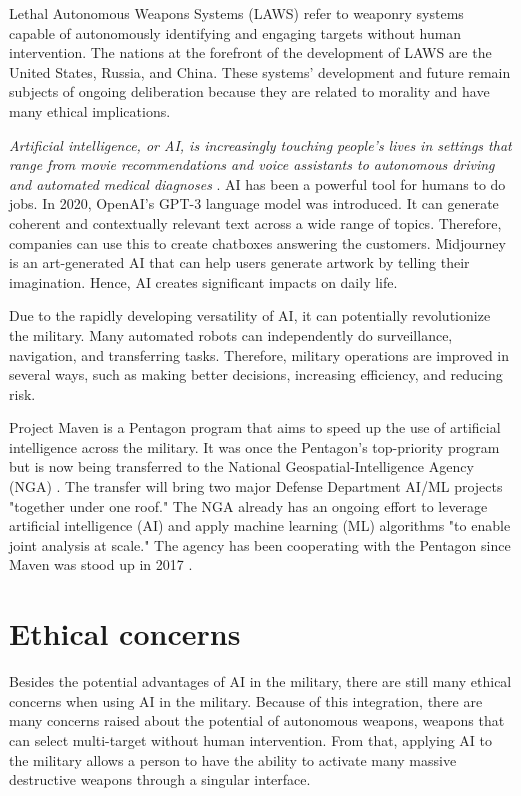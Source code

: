 \documentclass[12pt]{article}
\begin{document}
Lethal Autonomous Weapons Systems (LAWS) refer to weaponry systems capable of autonomously identifying and engaging targets without human intervention. The nations at the forefront of the development of LAWS are the United States, Russia, and China. These systems' development and future remain subjects of ongoing deliberation because they are related to morality and have many ethical implications.

\textit{ Artificial intelligence, or AI, is increasingly touching people’s lives in settings that range from movie recommendations and voice assistants to autonomous driving and automated medical diagnoses} \cite{unknown-author-2021}. AI has been a powerful tool for humans to do jobs. In 2020, OpenAI's GPT-3 language model was introduced. It can generate coherent and contextually relevant text across a wide range of topics. Therefore, companies can use this to create chatboxes answering the customers. Midjourney is an art-generated AI that can help users generate artwork by telling their imagination. Hence, AI creates significant impacts on daily life.


Due to the rapidly developing versatility of AI, it can potentially revolutionize the military. Many automated robots can independently do surveillance, navigation, and transferring tasks. Therefore, military operations are improved in several ways, such as making better decisions, increasing efficiency, and reducing risk.

Project Maven is a Pentagon program that aims to speed up the use of artificial intelligence across the military. It was once the Pentagon's top-priority program but is now being transferred to the National Geospatial-Intelligence Agency (NGA) \cite{hitchens-2022}. The transfer will bring two major Defense Department AI/ML projects "together under one roof." The NGA already has an ongoing effort to leverage artificial intelligence (AI) and apply machine learning (ML) algorithms "to enable joint analysis at scale." The agency has been cooperating with the Pentagon since Maven was stood up in 2017 \cite{hitchens-2022}.


\section{Ethical concerns}
Besides the potential advantages of AI in the military, there are still many ethical concerns when using AI in the military. Because of this integration, there are many concerns raised about the potential of autonomous weapons, weapons that can select multi-target without human intervention. From that, applying AI to the military allows a person to have the ability to activate many massive destructive weapons through a singular interface.  
\end{document}
